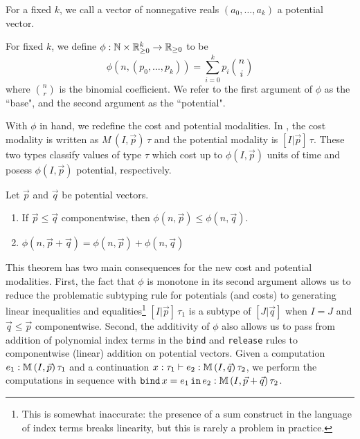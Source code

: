 \begin{definition}
For a fixed $k$, we call a vector of nonnegative reals $(a_0,\dots,a_k)$ a potential vector.
\end{definition}

\begin{definition}
For fixed $k$, we define $\phi : \mathbb{N} \times \mathbb{R}_{\geq 0}^k \to \mathbb{R}_{\geq 0}$ to be
$$
\phi\left(n,(p_0,\dots,p_k)\right) = \sum_{i=0}^k p_i\binom{n}{i}
$$
where $\binom{n}{r}$ is the binomial coefficient. We refer to the first argument of $\phi$ as the ``base", and the second argument as the ``potential".
\end{definition}

With $\phi$ in hand, we redefine the cost and potential modalities. In \dlambdaamor, the cost modality is written as $M \, (I,\vec{p}) \, \tau$ and the potential modality is $[I|\vec{p}] \,  \tau$. These two types classify values of type $\tau$ which cost up to $\phi(I,\vec{p})$ units of time and posess $\phi(I,\vec{p})$ potential, respectively.

\begin{theorem}
\label{thm:phi-linear}
Let $\vec{p}$ and $\vec{q}$ be potential vectors.
\begin{enumerate}
  \item If $\vec{p} \leq \vec{q}$ componentwise, then $\phi(n,\vec{p}) \leq \phi(n,\vec{q})$.
  \item $\phi(n,\vec{p} + \vec{q}) = \phi(n,\vec{p}) + \phi(n,\vec{q})$
\end{enumerate}
\end{theorem}

This theorem has two main consequences for the new cost and potential modalities. First, the fact that $\phi$ is monotone in its second argument allows us to reduce the problematic subtyping rule for potentials (and costs) to generating linear inequalities and equalities\footnote{
This is somewhat inaccurate: the presence of a sum construct in the language of index terms breaks linearity, but this is rarely a problem in practice.
} $[I|\vec{p}] \, \tau_1$ is a subtype of $[J|\vec{q}]$ when $I = J$ and $\vec{q} \leq \vec{p}$ componentwise. Second, the additivity of $\phi$ also allows us to pass from addition of polynomial index terms in the \texttt{bind} and \texttt{release} rules to componentwise (linear) addition on potential vectors. Given a computation $e_1 : \mathbb{M} \, (I,\vec{p}) \, \tau_1$ and a continuation $x : \tau_1 \vdash e_2 : \mathbb{M} \, (I,\vec{q}) \, \tau_2$,  we perform the computations in sequence with $\texttt{bind}\, x = e_1 \, \texttt{in}\, e_2 : \mathbb{M} \, (I,\vec{p} + \vec{q}) \, \tau_2$.

